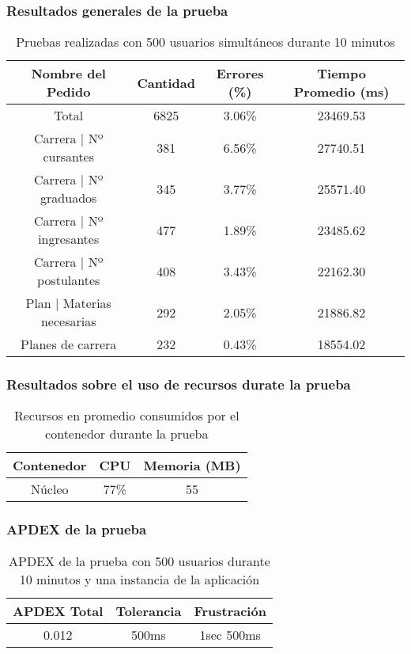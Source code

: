 \subsubsection{Resultados generales de la prueba}
\begin{table}[]
    \centering
    \makegapedcells
    \begin{tabular}{|c|c|c|c|}
    \hline
    Nombre del Pedido & Cantidad & Errores (\%) & Tiempo Promedio (ms) \\ \hline
    Total & 6825 & 3.06\% & 23469.53 \\ \hline
    Carrera | Nº cursantes & 381 & 6.56\% & 27740.51\\ \hline
    Carrera | Nº graduados & 345 & 3.77\% & 25571.40\\ \hline
    Carrera | Nº ingresantes & 477 & 1.89\% & 23485.62\\ \hline
    Carrera | Nº postulantes & 408 & 3.43\% & 22162.30\\ \hline
    Plan | Materias necesarias & 292 & 2.05\% & 21886.82\\ \hline
    Planes de carrera & 232 & 0.43\% & 18554.02\\ \hline

    \end{tabular}
    \caption{Pruebas realizadas con 500 usuarios simultáneos durante 10 minutos}
    \label{tab:tabla_planes}
\end{table}


\subsubsection{Resultados sobre el uso de recursos durate la prueba}
\begin{table}[]
    \centering
    \makegapedcells
    \begin{tabular}{|c|c|c}
    \hline
    Contenedor & CPU & Memoria (MB)\\ \hline
    Núcleo & 77\% & 55 \\ \hline
    \end{tabular}
    \caption{Recursos en promedio consumidos por el contenedor durante la prueba}
    \label{tab:tabla_planes}
\end{table}

\subsubsection{APDEX de la prueba}
\begin{table}[]
    \centering
    \makegapedcells
    \begin{tabular}{|c|c|c}
    \hline
    APDEX Total & Tolerancia & Frustración\\ \hline
    0.012 & 500ms & 1sec 500ms \\ \hline
    \end{tabular}
    \caption{APDEX de la prueba con 500 usuarios durante 10 minutos y una instancia de la aplicación}
    \label{tab:tabla_planes}
\end{table}

